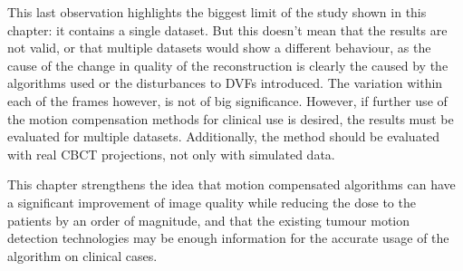 This last observation highlights the biggest limit of the study shown in this chapter: it contains a single dataset. But this doesn't mean that the results are not valid, or that multiple datasets would show a different behaviour, as the cause of the change in quality of the reconstruction is clearly the caused by the algorithms used or the disturbances to DVFs introduced. The variation within each of the frames however, is not of big significance. However, if further use of the motion compensation methods for clinical use is desired, the results must be evaluated for multiple datasets. Additionally, the method should be evaluated with real CBCT projections, not only with simulated data.

This chapter strengthens the idea that motion compensated algorithms can have a significant improvement of image quality while reducing the dose to the patients by an order of magnitude, and that the existing tumour motion detection technologies may be enough information for the accurate usage of the algorithm on clinical cases. 




